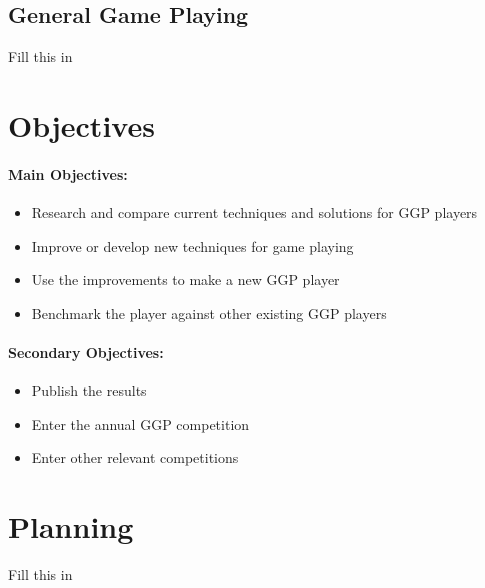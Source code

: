 \subsection{General Game Playing}

Fill this in

\section{Objectives}

\paragraph{Main Objectives:}
\begin{itemize}
\item Research and compare current techniques and solutions for GGP players 
\item Improve or develop new techniques for game playing
\item Use the improvements to make a new GGP player
\item Benchmark the player against other existing GGP players
\end{itemize}

\paragraph{Secondary Objectives:}
\begin{itemize}
\item Publish the results
\item Enter the annual GGP competition
\item Enter other relevant competitions
\end{itemize}




\section{Planning}

Fill this in





